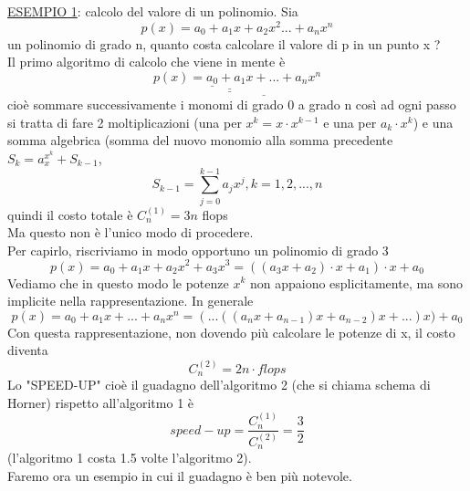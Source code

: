 \documentclass[12pt]{article}
\begin{document}
\underline{ESEMPIO 1}: calcolo del valore di un polinomio. Sia\\
\begin{equation*}
    p(x) = a_{0} + a_{1}x + a_2x^2... + a_{n}x^n
\end{equation*}
un polinomio di grado n, quanto costa calcolare il valore di p in un punto x ? \\
Il primo algoritmo di calcolo che viene in mente è \\
\begin{equation*}
    p(x) = \underline{\underline{\underline{\underline{a_{0}} + a_{1}x}} + ... + a_{n}x^n}
\end{equation*}
cioè sommare successivamente i monomi di grado 0 a grado n così ad ogni passo si tratta di fare 2 moltiplicazioni (una per $x^k = x \cdot x^{k-1}$ e una per $a_{k}\cdot x^{k}$) e una somma algebrica (somma del nuovo monomio alla somma precedente $S_{k} = a_{x}^{x^k}+ S_{k-1}$, 
\begin{equation*}
    S_{k-1}=\sum_{j=0}^{k-1} a_jx^j , k = 1,2,...,n
\end{equation*}
quindi il costo totale è $C^{(1)}_{n} = 3n$ flops \\
Ma questo non è l'unico modo di procedere.\\
Per capirlo, riscriviamo in modo opportuno un polinomio di grado 3\\
\begin{equation*}
    p(x) = a_{0} + a_{1}x + a_{2}x^2 + a_3x^3 = ((a_3x + a_2) \cdot x + a_1) \cdot x + a_0 
\end{equation*}
Vediamo che in questo modo le potenze $x^k$ non appaiono esplicitamente, ma sono implicite nella rappresentazione. In generale
\begin{equation*}
    p(x) = a_{0} + a_{1}x + ... + a_{n}x^n = (...((a_nx + a_{n-1}) x + a_{n-2})x + ...)x) + a_{0} 
\end{equation*}
Con questa rappresentazione, non dovendo più calcolare le potenze di x, il costo diventa
\begin{equation*}
    C_{n}^{(2)}=2n\cdot flops
\end{equation*}
Lo "SPEED-UP" cioè il guadagno dell'algoritmo 2 (che si chiama schema di Horner) rispetto all'algoritmo 1 è
\begin{equation*}
    speed-up=\frac{C_{n}^{(1)}}{C_{n}^{(2)}}=\frac{3}{2}
\end{equation*}
(l'algoritmo 1 costa 1.5 volte l'algoritmo 2).\\ Faremo ora un esempio in cui il guadagno è ben più notevole.\\
\end{document}
